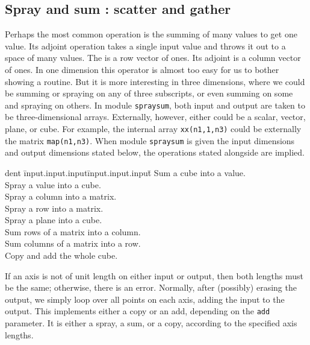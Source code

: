 \subsection{Spray and sum : scatter and gather}
Perhaps the most common operation is the summing of many values
to get one value.
Its adjoint operation takes a single input value
and throws it out to a space of many values.
The  is a row vector of ones.
Its adjoint is a column vector of ones.
In one dimension
this operator is almost too easy for us to bother showing a routine.
But it is more interesting in three dimensions,
where we could be summing or spraying on any of three subscripts,
or even summing on some and spraying on others.
In module \texttt{spraysum},
both input and output are taken
to be three-dimensional arrays.
Externally, however, either could be a scalar, vector, plane, or cube.
For example,
the internal array  {\tt xx(n1,1,n3)}
could be externally the matrix  {\tt map(n1,n3)}.
When
module \texttt{spraysum} is given
the input dimensions and output dimensions stated below,
the operations stated alongside are implied.
\begin{tabbing}
dent \= input.input.input\=  input.input.input\= \kill
{}       \>Sum a cube into a value.      \\
       \>Spray a value into a cube.\\
       \>Spray a column into a matrix.\\
       \>Spray a row into a matrix.\\
     \>Spray a plane into a cube.\\
       \>Sum rows of a matrix into a column.\\
       \>Sum columns of a matrix into a row.\\
    \>Copy and add the whole cube.
\end{tabbing}
If an axis is not of unit length on either input or output,
then both lengths must be the same; otherwise, there is an error.
Normally, after (possibly) erasing the output,
we simply loop over all points on each axis, adding the input to the output.
This implements either a copy or an add, depending on the {\tt add} parameter.
It is either a spray, a sum, or a copy,
according to the specified axis lengths.

